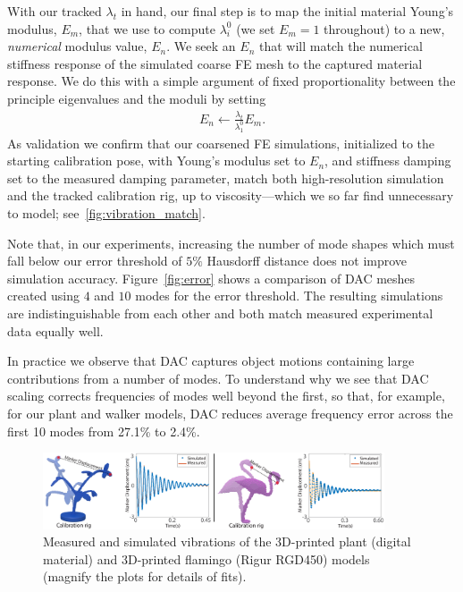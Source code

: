 With our tracked $\lambda_t$ in hand, our final step is to map the initial material Young's modulus, $E_m$, that we use to compute $\lambda_i^0$ (we set $E_m=1$ throughout)
to a new, \emph{numerical} modulus value, $E_n$.
We seek an $E_n$ that will match the numerical stiffness response of the simulated coarse FE mesh to the captured material response. We do this with a simple argument of fixed proportionality between the principle eigenvalues and the moduli by setting 
\begin{align}
E_n \leftarrow \frac{\lambda_t}{\lambda^0_1}  E_m.
\end{align}
As validation we confirm that our coarsened FE simulations, initialized to the starting calibration pose, with 
Young's modulus set to $E_n$, and stiffness damping set to the measured damping parameter, match both high-resolution simulation and the tracked calibration rig, up to viscosity---which we so far find unnecessary to model; see~\autoref{fig:vibration_match}. 

Note that, in our experiments, increasing the number of mode shapes which must fall below our error threshold of $5\%$  Hausdorff distance does not improve simulation accuracy. Figure~\ref{fig:error} shows a comparison of DAC meshes created using $4$ and $10$ modes for the error threshold. The resulting simulations are indistinguishable from each other and both match measured experimental data equally well. 

In practice we observe that DAC captures object motions containing large contributions from a number of modes. To understand why we see that DAC scaling corrects frequencies of modes well beyond the first, so that, for example, for our plant and walker models, DAC reduces average frequency error across the first 10 modes from 27.1\% to 2.4\%. 

\begin{figure}
	\centering
	\includegraphics[width=0.9\textwidth]{images/measurePlantEdna.png}
	\caption{Measured and simulated vibrations of the 3D-printed plant (digital material) and 3D-printed flamingo (Rigur RGD450) models (magnify the plots for details of fits).}
	\label{fig:vibration_match_plant}
\end{figure}

